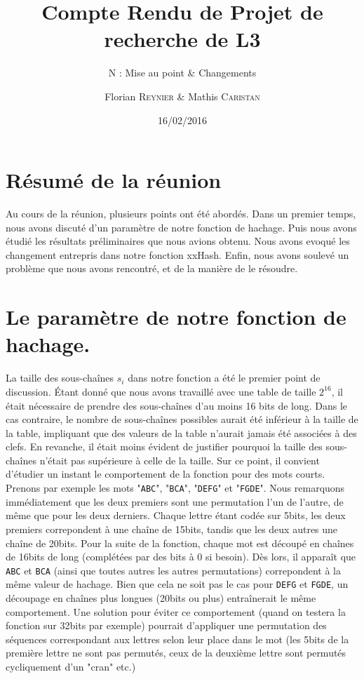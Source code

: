 \documentclass[final,twoside,article,10pt]{scrartcl}
\begin{document}
%
\title{Compte Rendu de Projet de recherche de L3}
\subtitle{N : Mise au point \& Changements}
\author{Florian \textsc{Reynier} \& Mathis \textsc{Caristan}}
%
\date{16/02/2016}

\maketitle

\section*{Résumé de la réunion}
    Au cours de la réunion, plusieurs points ont été abordés.
    Dans un premier temps, nous avons discuté d'un paramètre de notre fonction de hachage.
    Puis nous avons étudié les résultats préliminaires que nous avions obtenu.
    Nous avons evoqué les changement entrepris dans notre fonction xxHash.
    Enfin, nous avons soulevé un problème que nous avons rencontré, et de la manière de le résoudre.

\section{Le paramètre de notre fonction de hachage.}
    La taille des sous-chaînes $s_i$ dans notre fonction a été le premier point de discussion.
    \'Etant donné que nous avons travaillé avec une table de taille $2^{16}$, il était nécessaire de prendre des sous-chaînes d'au moins 16 bits de long. Dans le cas contraire, le nombre de sous-chaînes possibles aurait été inférieur à la taille de la table, impliquant que des valeurs de la table n'aurait jamais été associées à des clefs.
    En revanche, il était moins évident de justifier pourquoi la taille des sous-chaînes n'était pas supérieure à celle de la taille.
    Sur ce point, il convient d'étudier un instant le comportement de la fonction pour des mots courts.
    Prenons par exemple les mots "\texttt{ABC}", "\texttt{BCA}", "\texttt{DEFG}" et "\texttt{FGDE}". Nous remarquons immédiatement que les deux premiers sont une permutation l'un de l'autre, de même que pour les deux derniers.
    Chaque lettre étant codée sur 5bits, les deux premiers correpondent à une chaîne de 15bits, tandis que les deux autres une chaîne de 20bits.
    Pour la suite de la fonction, chaque mot est découpé en chaînes de 16bits de long (complétées par des bits à 0 si besoin).
    Dès lors, il apparaît que \texttt{ABC} et \texttt{BCA} (ainsi que toutes autres les autres permutations) correpondent à la même valeur de hachage.
    Bien que cela ne soit pas le cas pour \texttt{DEFG} et \texttt{FGDE}, un découpage en chaînes plus longues (20bits ou plus) entraînerait le même comportement.
    Une solution pour éviter ce comportement (quand on testera la fonction sur 32bits par exemple) pourrait d'appliquer une permutation des séquences correspondant aux lettres selon leur place dans le mot (les 5bits de la première lettre ne sont pas permutés, ceux de la deuxième lettre sont permutés cycliquement d'un "cran" etc.) 
\end{document}
